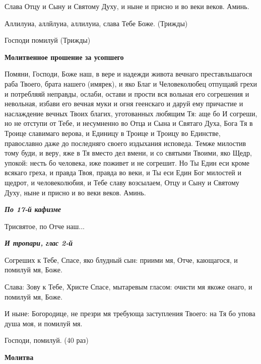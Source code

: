 Слава Отцу и Сыну и Святому Духу, и ныне и присно и во веки веков. Аминь. 

Аллилуиа, аллйлуиа, аллилуиа, слава Тебе Боже. (Трижды) 

Господи помилуй (Трижды)


\medskip


\bfseries Молитвенное прошение за усопшего\normalfont{}


Помяни, Господи, Боже наш, в вере и надежди живота вечнаго преставльшагося раба Твоего, брата нашего (имярек), и яко Благ и Человеколюбец отпущаяй грехи и потребляяй неправды, ослаби, остави и прости вся вольная его согрешения и невольная, избави его вечная муки и огня геенскаго и даруй ему причастие и наслаждение вечных Твоих благих, уготованных любящим Тя: аще бо И согреши, но не отступи от Тебе, и несумненно во Отца и Сына и Святаго Духа, Бога Тя в Троице славимаго верова, и Единицу в Троице и Троицу во Единстве, православно даже до последняго своего издыхания исповеда. Темже милостив тому буди, и веру, яже в Тя вместо дел вмени, и со святыми Твоими, яко Щедр, упокой: несть бо человека, иже поживет и не согрешит. Но Ты Един еси кроме всякаго греха, и правда Твоя, правда во веки, и Ты еси Един Бог милостей и щедрот, и человеколюбия, и Тебе славу возсылаем, Отцу и Сыну и Святому Духу, ныне и присно и во веки веков. Аминь. 

\bfseries \itshape По 17-й кафизме 

\normalfont{}\normalfont{}Трисвятое, по Отче наш... 

\bfseries \itshape И тропари, глас 2-й 

\normalfont{}\normalfont{}Согреших к Тебе, Спасе, яко блудный сын: приими мя, Отче, кающагося, и помилуй мя, Боже. 

Слава: Зову к Тебе, Христе Спасе, мытаревым гласом: очисти мя якоже онаго, и помилуй мя, Боже. 

И ныне: Богородице, не презри мя требующа заступления Твоего: на Тя бо упова душа моя, и помилуй мя. 

Господи, помилуй. (40 раз)


\medskip


\bfseries Молитва\normalfont{}


